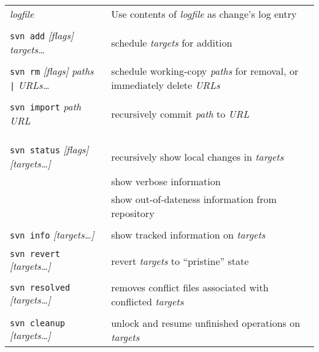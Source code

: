\documentclass{report}
\begin{document}
\begin{tabular}{ll}
\hspace{0.5in}{\tt -F} {\sl logfile}		&
Use contents of {\sl logfile} as change's log entry		 \\

\\
{\tt svn add} {\sl [flags]} {\sl targets\dots}    &
schedule {\sl targets} for addition		         \\

\\
{\tt svn rm} {\sl [flags]} {\sl paths} \verb!|! {\sl URLs\dots}	&
schedule working-copy {\sl paths} for removal,
or immediately delete {\sl URLs}	 \\

\\
{\tt svn import} {\sl path} {\sl URL}	&
recursively commit {\sl path} to {\sl URL} \\

\\
\\
\vspace{0.1in} \hspace{-0.1in}{\bf\Large Working Copy Maintenance} \\

{\tt svn status} {\sl [flags]} {\sl [targets\dots]}	&
recursively show local changes in {\sl targets}  \\

\hspace{0.5in}{\tt -v}		&
show verbose information		  \\

\hspace{0.5in}{\tt -u}		&
show out-of-dateness information from repository		  \\

\\
{\tt svn info} {\sl [targets\dots]}	&
show tracked information on {\sl targets}   \\

\\
{\tt svn revert} {\sl [targets\dots]}	&
revert {\sl targets} to ``pristine'' state   \\

\\
{\tt svn resolved} {\sl [targets\dots]}	&
removes conflict files associated with conflicted {\sl targets}   \\

\\
{\tt svn cleanup} {\sl [targets\dots]}	&
unlock and resume unfinished operations on {\sl targets}   \\



\end{tabular}
\end{document}
